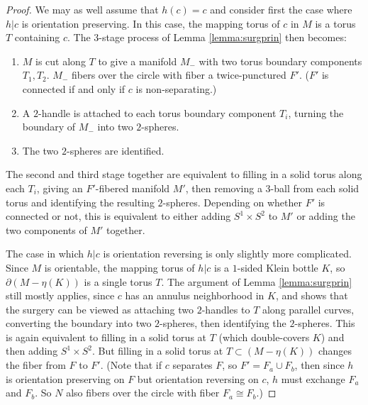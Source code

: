 \documentclass{amsart}
\newcommand{\bdd}{\mbox{$\partial$}}
\begin{document}
\begin{proof}  We may as well assume that $h(c) = c$ and consider first the case where $h|c$ is orientation preserving.  In this case, the mapping torus of $c$ in $M$ is a torus $T$ containing $c$.  The $3$-stage process of Lemma \ref{lemma:surgprin} then becomes:
\begin{enumerate}
\item $M$ is cut along $T$ to give a manifold $M_-$ with two torus boundary components $T_1, T_2$.  $M_-$ fibers over the circle with fiber a twice-punctured $F'$. ($F'$ is connected if and only if $c$ is non-separating.)
\item A $2$-handle is attached to each torus boundary component $T_i$, turning the boundary of $M_-$ into two $2$-spheres.
\item The two $2$-spheres are identified.
\end{enumerate}
The second and third stage together are equivalent to filling in a solid torus along each $T_i$, giving an $F'$-fibered manifold $M'$, then removing a $3$-ball from each solid torus and identifying the resulting $2$-spheres.  Depending on whether $F'$ is connected or not, this is equivalent to either adding $S^1 \times S^2$ to $M'$ or adding the two components of $M'$ together.

The case in which $h|c$ is orientation reversing is only slightly more complicated.  Since $M$ is orientable, the mapping torus of $h|c$ is a $1$-sided Klein bottle $K$, so $\bdd(M - \eta(K))$ is a single torus $T$.  The argument of Lemma \ref{lemma:surgprin} still mostly applies, since $c$ has an annulus neighborhood in $K$, and shows that the surgery can be viewed as attaching two $2$-handles to $T$ along parallel curves, converting the boundary into two $2$-spheres, then identifying the $2$-spheres.  This is again equivalent to filling in a solid torus at $T$ (which double-covers $K$) and then adding $S^1 \times S^2$.  But filling in a solid torus at $T \subset (M - \eta(K))$ changes the fiber from $F$ to $F'$.  (Note that if $c$ separates $F$, so $F' = F_a \cup F_b$, then since $h$ is orientation preserving on $F$ but orientation reversing on $c$, $h$ must exchange $F_a$ and $F_b$.  So $N$ also fibers over the circle with fiber $F_a \cong F_b$.)
\end{proof}
%
\end{document}
